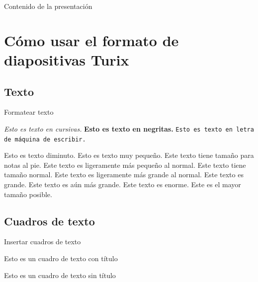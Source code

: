 \documentclass{beamer}
\begin{document}
\begin{frame}
    \maketitle
\end{frame}

\begin{frame}{Contenido de la presentación}
    \tableofcontents
\end{frame}

\section{Cómo usar el formato de diapositivas Turix}

\subsection{Texto}

\begin{frame}{Formatear texto}

\textit{Esto es texto en cursivas.} \textbf{Esto es texto en negritas.} \texttt{Esto es texto en letra de máquina de escribir.}

\tiny{Esto es texto diminuto.}
\scriptsize{Esto es texto muy pequeño.}
\footnotesize{Este texto tiene tamaño para notas al pie.}
\small{Este texto es ligeramente más pequeño al normal.}
\normalsize{Este texto tiene tamaño normal.}
\large{Este texto es ligeramente más grande al normal.}
\Large{Este texto es grande.}
\LARGE{Este texto es aún más grande.}
\huge{Este texto es enorme.}
\Huge{Este es el mayor tamaño posible.}

\end{frame}

\subsection{Cuadros de texto}

\begin{frame}{Insertar cuadros de texto}
    \begin{tcolorbox}[colback=backframe_color,colframe=beamer_color,title=Este es el título del cuadro de texto]
    Esto es un cuadro de texto con título
    \end{tcolorbox}

    \begin{tcolorbox}[colback=backframe_color,colframe=beamer_color]
    Esto es un cuadro de texto sin título
    \end{tcolorbox}
\end{frame}
\end{document}
